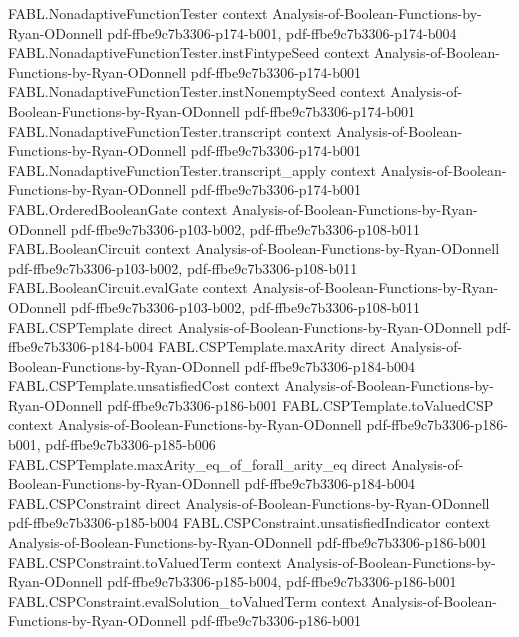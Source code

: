 \begin{theorem}
\proofstep
  {FABL.NonadaptiveFunctionTester}
  {context}
  {Analysis-of-Boolean-Functions-by-Ryan-ODonnell}
  {pdf-ffbe9c7b3306-p174-b001,
    pdf-ffbe9c7b3306-p174-b004}
\proofstep
  {FABL.NonadaptiveFunctionTester.instFintypeSeed}
  {context}
  {Analysis-of-Boolean-Functions-by-Ryan-ODonnell}
  {pdf-ffbe9c7b3306-p174-b001}
\proofstep
  {FABL.NonadaptiveFunctionTester.instNonemptySeed}
  {context}
  {Analysis-of-Boolean-Functions-by-Ryan-ODonnell}
  {pdf-ffbe9c7b3306-p174-b001}
\proofstep
  {FABL.NonadaptiveFunctionTester.transcript}
  {context}
  {Analysis-of-Boolean-Functions-by-Ryan-ODonnell}
  {pdf-ffbe9c7b3306-p174-b001}
\proofstep
  {FABL.NonadaptiveFunctionTester.transcript_apply}
  {context}
  {Analysis-of-Boolean-Functions-by-Ryan-ODonnell}
  {pdf-ffbe9c7b3306-p174-b001}
\proofstep
  {FABL.OrderedBooleanGate}
  {context}
  {Analysis-of-Boolean-Functions-by-Ryan-ODonnell}
  {pdf-ffbe9c7b3306-p103-b002,
    pdf-ffbe9c7b3306-p108-b011}
\proofstep
  {FABL.BooleanCircuit}
  {context}
  {Analysis-of-Boolean-Functions-by-Ryan-ODonnell}
  {pdf-ffbe9c7b3306-p103-b002,
    pdf-ffbe9c7b3306-p108-b011}
\proofstep
  {FABL.BooleanCircuit.evalGate}
  {context}
  {Analysis-of-Boolean-Functions-by-Ryan-ODonnell}
  {pdf-ffbe9c7b3306-p103-b002,
    pdf-ffbe9c7b3306-p108-b011}
\proofstep
  {FABL.CSPTemplate}
  {direct}
  {Analysis-of-Boolean-Functions-by-Ryan-ODonnell}
  {pdf-ffbe9c7b3306-p184-b004}
\proofstep
  {FABL.CSPTemplate.maxArity}
  {direct}
  {Analysis-of-Boolean-Functions-by-Ryan-ODonnell}
  {pdf-ffbe9c7b3306-p184-b004}
\proofstep
  {FABL.CSPTemplate.unsatisfiedCost}
  {context}
  {Analysis-of-Boolean-Functions-by-Ryan-ODonnell}
  {pdf-ffbe9c7b3306-p186-b001}
\proofstep
  {FABL.CSPTemplate.toValuedCSP}
  {context}
  {Analysis-of-Boolean-Functions-by-Ryan-ODonnell}
  {pdf-ffbe9c7b3306-p186-b001,
    pdf-ffbe9c7b3306-p185-b006}
\proofstep
  {FABL.CSPTemplate.maxArity_eq_of_forall_arity_eq}
  {direct}
  {Analysis-of-Boolean-Functions-by-Ryan-ODonnell}
  {pdf-ffbe9c7b3306-p184-b004}
\proofstep
  {FABL.CSPConstraint}
  {direct}
  {Analysis-of-Boolean-Functions-by-Ryan-ODonnell}
  {pdf-ffbe9c7b3306-p185-b004}
\proofstep
  {FABL.CSPConstraint.unsatisfiedIndicator}
  {context}
  {Analysis-of-Boolean-Functions-by-Ryan-ODonnell}
  {pdf-ffbe9c7b3306-p186-b001}
\proofstep
  {FABL.CSPConstraint.toValuedTerm}
  {context}
  {Analysis-of-Boolean-Functions-by-Ryan-ODonnell}
  {pdf-ffbe9c7b3306-p185-b004,
    pdf-ffbe9c7b3306-p186-b001}
\proofstep
  {FABL.CSPConstraint.evalSolution_toValuedTerm}
  {context}
  {Analysis-of-Boolean-Functions-by-Ryan-ODonnell}
  {pdf-ffbe9c7b3306-p186-b001}

\end{theorem}
